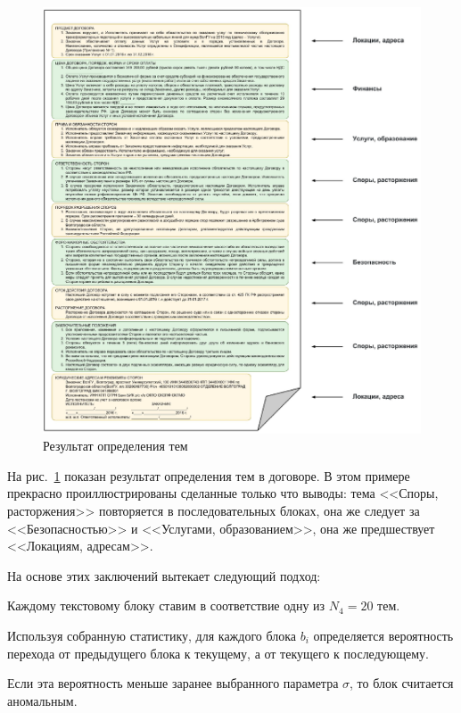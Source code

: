 \documentclass[12pt]{article}
\begin{document}
\begin{center}
	\begin{figure}[h!]
		\centering
		\includegraphics[scale=0.8]{images/im6.eps}
		\caption{Результат определения тем}
		\label{im6}
	\end{figure}
\end{center}

На рис.~\ref{im6} показан результат определения тем в договоре. В этом примере прекрасно проиллюстрированы сделанные только что выводы: тема <<Споры, расторжения>> повторяется в последовательных блоках, она же следует за <<Безопасностью>> и <<Услугами, образованием>>, она же предшествует <<Локациям, адресам>>. 

На основе этих заключений вытекает следующий подход:

\par\begin{enumerate}{
		\vspace{-0.2cm}\item Каждому текстовому блоку ставим в соответствие одну из $N_4 = 20$ тем.
		\vspace{-0.2cm}\item Используя собранную статистику, для каждого блока $b_i$ определяется вероятность перехода от предыдущего блока к текущему, а от текущего к последующему.  
		\vspace{-0.2cm}\item Если эта вероятность меньше заранее выбранного параметра $\sigma$, то блок считается аномальным.
}\end{enumerate}
\end{document}
